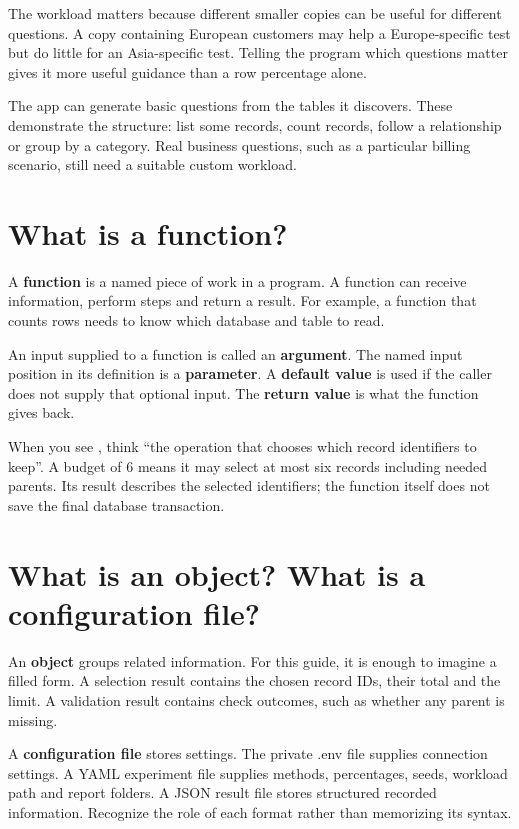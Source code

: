 \documentclass[12pt,a4paper,oneside]{report}
\begin{document}
The workload matters because different smaller copies can be useful for different questions. A copy containing European customers may help a Europe-specific test but do little for an Asia-specific test. Telling the program which questions matter gives it more useful guidance than a row percentage alone.

The app can generate basic questions from the tables it discovers. These demonstrate the structure: list some records, count records, follow a relationship or group by a category. Real business questions, such as a particular billing scenario, still need a suitable custom workload.

\section{What is a function?}
A \textbf{function} is a named piece of work in a program. A function can receive information, perform steps and return a result. For example, a function that counts rows needs to know which database and table to read.

An input supplied to a function is called an \textbf{argument}. The named input position in its definition is a \textbf{parameter}. A \textbf{default value} is used if the caller does not supply that optional input. The \textbf{return value} is what the function gives back.

When you see , think ``the operation that chooses which record identifiers to keep''. A budget of 6 means it may select at most six records including needed parents. Its result describes the selected identifiers; the function itself does not save the final database transaction.

\section{What is an object? What is a configuration file?}
An \textbf{object} groups related information. For this guide, it is enough to imagine a filled form. A selection result contains the chosen record IDs, their total and the limit. A validation result contains check outcomes, such as whether any parent is missing.

A \textbf{configuration file} stores settings. The private .env file supplies connection settings. A YAML experiment file supplies methods, percentages, seeds, workload path and report folders. A JSON result file stores structured recorded information. Recognize the role of each format rather than memorizing its syntax.
\end{document}
